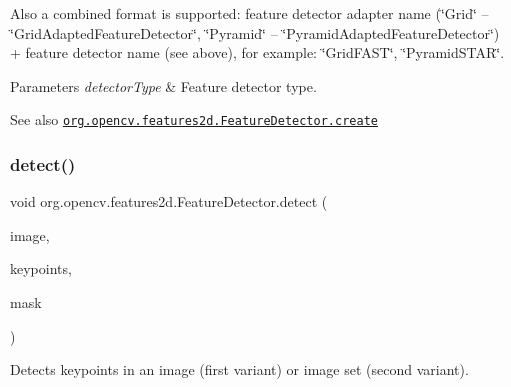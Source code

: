Also a combined format is supported\+: feature detector adapter name ({\ttfamily \char`\"{}\+Grid\char`\"{}} -- \char`\"{}\+Grid\+Adapted\+Feature\+Detector\char`\"{}, {\ttfamily \char`\"{}\+Pyramid\char`\"{}} -- \char`\"{}\+Pyramid\+Adapted\+Feature\+Detector\char`\"{}) + feature detector name (see above), for example\+: {\ttfamily \char`\"{}\+Grid\+F\+A\+S\+T\char`\"{}}, {\ttfamily \char`\"{}\+Pyramid\+S\+T\+A\+R\char`\"{}}.


\begin{DoxyParams}{Parameters}
{\em detector\+Type} & Feature detector type.\\
\hline
\end{DoxyParams}
\begin{DoxySeeAlso}{See also}
\href{http://docs.opencv.org/modules/features2d/doc/common_interfaces_of_feature_detectors.html#featuredetector-create}{\tt org.\+opencv.\+features2d.\+Feature\+Detector.\+create} 
\end{DoxySeeAlso}
\mbox{\label{classorg_1_1opencv_1_1features2d_1_1_feature_detector_a0682aacc52f2a50b80ba5d439acc6aef}} 
\subsubsection{\texorpdfstring{detect()}{detect()}\hspace{0.1cm}{\footnotesize\ttfamily [1/4]}}
{\footnotesize\ttfamily void org.\+opencv.\+features2d.\+Feature\+Detector.\+detect (\begin{DoxyParamCaption}\item[{\mbox{\hyperlink{classorg_1_1opencv_1_1core_1_1_mat}{Mat}}}]{image,  }\item[{\mbox{\hyperlink{classorg_1_1opencv_1_1core_1_1_mat_of_key_point}{Mat\+Of\+Key\+Point}}}]{keypoints,  }\item[{\mbox{\hyperlink{classorg_1_1opencv_1_1core_1_1_mat}{Mat}}}]{mask }\end{DoxyParamCaption})}

Detects keypoints in an image (first variant) or image set (second variant).


